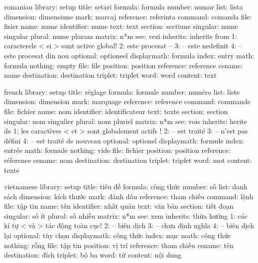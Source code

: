 \startmessages  romanian library: setup
        title:  setari
      formula:  formula
       number:  numar
         list:  lista
    dimension:  dimensiune
         mark:  marcaj
    reference:  referinta
      command:  comanda
         file:  fisier
         name:  nume
   identifier:  nume
         text:  text
      section:  sectiune
     singular:  nume singular
       plural:  nume pluram
       matrix:  n*m
          see:  vezi
     inherits:  inherits from
            1:  caracterele < si > sunt active global!
            2:  este procesat --
            3:  -- este nedefinit
            4:  -- este procesat din nou
     optional:  optioneel
  displaymath:  formula
        index:  entry
         math:  formula
      nothing:  empty
         file:  file
     position:  position
    reference:  reference
       csname:  name
  destination:  destination
      triplet:  triplet
         word:  word
      content:  text
\stopmessages

\startmessages  french  library: setup
        title:  réglage
      formula:  formule
       number:  numéro
         list:  liste
    dimension:  dimension
         mark:  marquage
    reference:  reference
      command:  commande
         file:  fichier
         name:  nom
   identifier:  identificateur
         text:  texte
      section:  section
     singular:  nom singulier
       plural:  nom pluriel
       matrix:  n*m
          see:  vois
     inherits:  herite de
            1:  les caractères < et > sont globalement actifs !
            2:  -- est traité
            3:  -- n'est pas défini
            4:  -- est traité de nouveau
     optional:  optionel
  displaymath:  formule
        index:  entrée
         math:  formule
      nothing:  vide
         file:  fichier
     position:  position
    reference:  réference
       csname:  nom
  destination:  destination
      triplet:  triplet
         word:  mot
      content:  texte
\stopmessages

\startmessages  vietnamese  library: setup
        title:  tiêu đề
      formula:  công thức
       number:  số
         list:  danh sách
    dimension:  kích thước
         mark:  đánh dấu
    reference:  tham chiếu
      command:  lệnh
         file:  tập tin
         name:  tên
   identifier:  nhất quán
         text:  văn bản
      section:  tiết đoạn
     singular:  số ít
       plural:  số nhiều
       matrix:  n*m
          see:  xem
     inherits:  thừa hưởng
            1:  các kí tự < và > tác động toàn cục!
            2:  -- biên dịch
            3:  -- chưa định nghĩa
            4:  -- biên dịch lại
     optional:  tùy chọn
  displaymath:  công thức
        index:  mục
         math:  công thức
      nothing:  rỗng
         file:  tập tin
     position:  vị trí
    reference:  tham chiếu
       csname:  tên
  destination:  đích
      triplet:  bộ ba
         word:  từ
      content:  nội dung
\stopmessages

